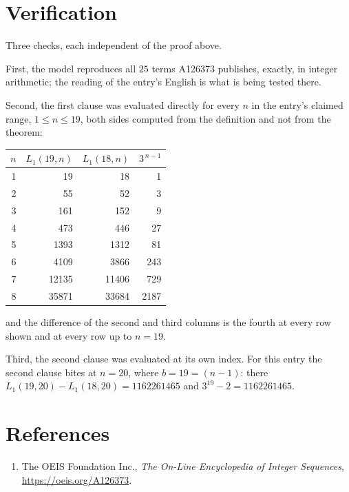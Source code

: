 \documentclass[11pt,a4paper]{article}
\theoremstyle{plain}
\theoremstyle{definition}
\begin{document}
\section{Verification}

Three checks, each independent of the proof above.

First, the model reproduces all $25$ terms A126373 publishes, exactly, in integer
arithmetic; the reading of the entry's English is what is being tested there.

Second, the first clause was evaluated directly for every $n$ in the entry's claimed range,
$1\le n\le19$, both sides computed from the definition and not from the theorem:

\begin{center}
\begin{tabular}{rrrr}
$n$ & $L_{1}(19,n)$ & $L_{1}(18,n)$ & $3^{\,n-1}$ \\ \hline
1 & 19 & 18 & 1 \\
2 & 55 & 52 & 3 \\
3 & 161 & 152 & 9 \\
4 & 473 & 446 & 27 \\
5 & 1393 & 1312 & 81 \\
6 & 4109 & 3866 & 243 \\
7 & 12135 & 11406 & 729 \\
8 & 35871 & 33684 & 2187 \\
\end{tabular}
\end{center}

\noindent and the difference of the second and third columns is the fourth at every row shown
and at every row up to $n=19$.

Third, the second clause was evaluated at its own index. For this entry the second clause bites at $n=20$, where $b=19=(n-1)$: there $L_{1}(19,20)-L_{1}(18,20)=1162261465$ and $3^{19}-2=1162261465$.

\section*{References}
\begin{enumerate}
\item The OEIS Foundation Inc., \emph{The On-Line Encyclopedia of Integer Sequences},
\url{https://oeis.org/A126373}.
\end{enumerate}
\end{document}
